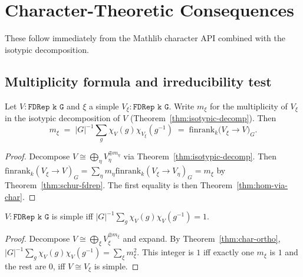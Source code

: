 \chapter{Character-Theoretic Consequences}
\label{chap:character-consequences}

These follow immediately from the Mathlib character API combined with the
isotypic decomposition.

\section{Multiplicity formula and irreducibility test}

\begin{theorem}
  \label{thm:multiplicity-formula}
  \leanok
  Let $V : \texttt{FDRep k G}$ and $\xi$ a simple $V_\xi : \texttt{FDRep k G}$.
  Write $m_\xi$ for the multiplicity of $V_\xi$ in the isotypic decomposition
  of $V$ (Theorem~\ref{thm:isotypic-decomp}). Then
  \[
     m_\xi \;=\; |G|^{-1}\sum_{g} \chi_V(g)\chi_{V_\xi}(g^{-1})
     \;=\; \mathrm{finrank}_k\bigl(V_\xi \to V\bigr)_G.
  \]
\end{theorem}

\begin{proof}\leanok
  Decompose $V \cong \bigoplus_\eta V_\eta^{\oplus m_\eta}$ via
  Theorem~\ref{thm:isotypic-decomp}. Then
  $\mathrm{finrank}_k(V_\xi \to V)_G = \sum_\eta m_\eta \mathrm{finrank}_k(V_\xi \to V_\eta)_G
  = m_\xi$ by Theorem~\ref{thm:schur-fdrep}. The first equality is then
  Theorem~\ref{thm:hom-via-char}.
\end{proof}

\begin{corollary}
  \label{cor:irred-test}
  \leanok
  $V : \texttt{FDRep k G}$ is simple iff
  $|G|^{-1}\sum_g \chi_V(g)\chi_V(g^{-1}) = 1$.
\end{corollary}

\begin{proof}
  Decompose $V \cong \bigoplus_\xi V_\xi^{\oplus m_\xi}$ and expand. By
  Theorem~\ref{thm:char-ortho}, $|G|^{-1}\sum_g \chi_V(g)\chi_V(g^{-1}) =
  \sum_\xi m_\xi^2$. This integer is $1$ iff exactly one $m_\xi$ is $1$ and
  the rest are $0$, iff $V \cong V_\xi$ is simple.
\end{proof}

